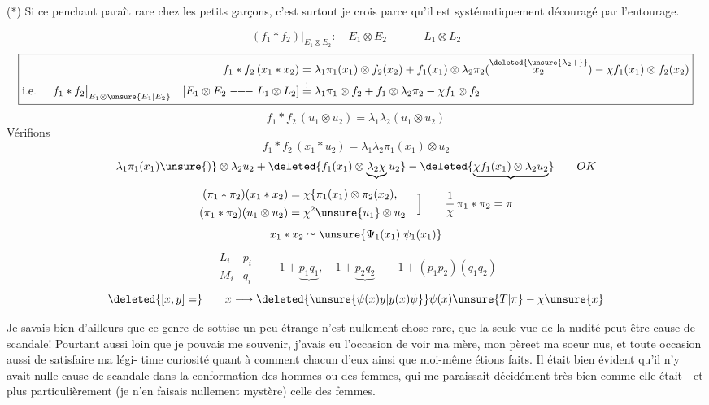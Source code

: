(*) Si ce penchant paraît rare chez les petits garçons, c'est surtout je crois
parce qu'il est systématiquement découragé par l'entourage.

\[
(f_1*f_2)\big|_{E_1\otimes E_2}:\quad E_1\otimes E_2\mathrel{-\!\!-\!\!-}L_1\otimes L_2
\]
\[
\boxed{\begin{aligned}
f_1*f_2\,(x_1*x_2)&=\lambda_1\pi_1(x_1)\otimes f_2(x_2)
+f_1(x_1)\otimes\lambda_2\pi_2(\overset{\deleted{\unsure{\lambda_2+}}}{x_2})
-\chi f_1(x_1)\otimes f_2(x_2)\\
\text{i.e. }\quad f_1*f_2\big|_{E_1\otimes\unsure{E_1|E_2}}
\quad[E_1\otimes E_2\mathrel{-\!\!-\!\!-}L_1\otimes L_2]
&\overset{!}{=}\lambda_1\pi_1\otimes f_2+f_1\otimes\lambda_2\pi_2-\chi f_1\otimes f_2
\end{aligned}}
\]
\[
f_1*f_2\,(u_1\otimes u_2)=\lambda_1\lambda_2(u_1\otimes u_2)
\]
Vérifions
\[
f_1*f_2\,(x_1*u_2)=\lambda_1\lambda_2\pi_1(x_1)\otimes u_2
\]
\[
\lambda_1\pi_1(x_1)\unsure{)}\otimes\lambda_2u_2+
\deleted{f_1(x_1)\otimes\underbrace{\lambda_2\chi}u_2}
-\deleted{\underbrace{\chi f_1(x_1)\otimes\lambda_2u_2}}
\qquad OK
\]
\[
\begin{aligned}
(\pi_1*\pi_2)(x_1*x_2)&=\chi\{\pi_1(x_1)\otimes\pi_2(x_2),\\
(\pi_1*\pi_2)(u_1\otimes u_2)&=\chi^2\unsure{u_1}\otimes u_2
\end{aligned}\quad\Big]
\qquad\frac1\chi\,\pi_1*\pi_2=\pi
\]
\[
x_1*x_2\simeq\unsure{\Psi_1(x_1)|\psi_1(x_1)}
\]
\[
\begin{array}{cc}
L_i&p_i\\[1em]M_i&q_i
\end{array}
\qquad1+\underbrace{p_1q_1},\quad1+\underbrace{p_2q_2}
\qquad1+(p_1p_2)(q_1q_2)
\]
\[
\deleted{[x,y]=}\qquad
x\longrightarrow\deleted{\unsure{\psi(x)y|y(x)\psi}}
\psi(x)\unsure{T|\pi}-\chi\unsure{x}
\]

Je savais bien d'ailleurs que ce genre de sottise un peu étrange n'est
nullement chose rare, que la seule vue de la nudité peut être cause de scandale!
Pourtant aussi loin que je pouvais me souvenir, j'avais eu l'occasion de voir ma
mère, mon père\quad et ma soeur nus, et toute occasion aussi de satisfaire ma légi-\newline
time curiosité quant à comment chacun d'eux ainsi que moi-même étions faits. Il
était bien évident qu'il n'y avait nulle cause de scandale dans la conformation
des hommes ou des femmes, qui me paraissait décidément très bien comme elle
était - et plus particulièrement (je n'en faisais nullement mystère) celle des
femmes.

